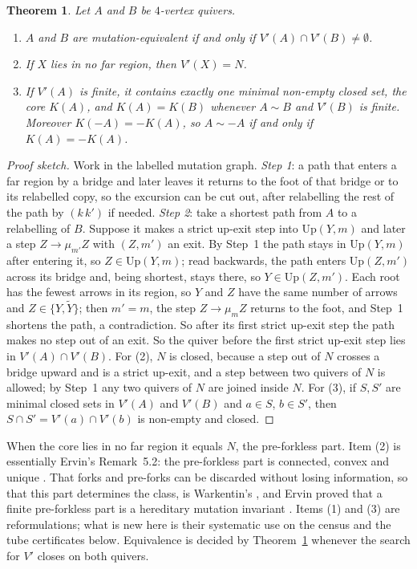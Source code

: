 \documentclass[11pt]{amsart}
\newtheorem{theorem}{Theorem}[section]
\theoremstyle{definition}
\theoremstyle{remark}
\newcommand{\Vp}{V'}
\begin{document}
\begin{theorem}\label{thm:core}
Let $A$ and $B$ be $4$-vertex quivers.
\begin{enumerate}
\item $A$ and $B$ are mutation-equivalent if and only if $\Vp(A)\cap\Vp(B)\ne\emptyset$.
\item If $X$ lies in no far region, then $\Vp(X)=N$.
\item If $\Vp(A)$ is finite, it contains exactly one minimal non-empty closed set, the \emph{core} $K(A)$, and $K(A)=K(B)$ whenever $A\sim B$ and $\Vp(B)$ is finite. Moreover $K(-A)=-K(A)$, so $A\sim-A$ if and only if $K(A)=-K(A)$.
\end{enumerate}
\end{theorem}
\begin{proof}[Proof sketch]
Work in the labelled mutation graph. \emph{Step 1}: a path that enters a far region by a bridge and later leaves it returns to the foot of that bridge or to its relabelled copy, so the excursion can be cut out, after relabelling the rest of the path by $(k\,k')$ if needed. \emph{Step 2}: take a shortest path from $A$ to a relabelling of $B$. Suppose it makes a strict up-exit step into $\mathrm{Up}(Y,m)$ and later a step $Z\to\mu_{m'}Z$ with $(Z,m')$ an exit. By Step~1 the path stays in $\mathrm{Up}(Y,m)$ after entering it, so $Z\in\mathrm{Up}(Y,m)$; read backwards, the path enters $\mathrm{Up}(Z,m')$ across its bridge and, being shortest, stays there, so $Y\in\mathrm{Up}(Z,m')$. Each root has the fewest arrows in its region, so $Y$ and $Z$ have the same number of arrows and $Z\in\{Y,\tilde Y\}$; then $m'=m$, the step $Z\to\mu_mZ$ returns to the foot, and Step~1 shortens the path, a contradiction. So after its first strict up-exit step the path makes no step out of an exit. So the quiver before the first strict up-exit step lies in $\Vp(A)\cap\Vp(B)$. For (2), $N$ is closed, because a step out of $N$ crosses a bridge upward and is a strict up-exit, and a step between two quivers of $N$ is allowed; by Step~1 any two quivers of $N$ are joined inside $N$. For (3), if $S,S'$ are minimal closed sets in $\Vp(A)$ and $\Vp(B)$ and $a\in S$, $b\in S'$, then $S\cap S'=\Vp(a)\cap\Vp(b)$ is non-empty and closed.
\end{proof}

When the core lies in no far region it equals $N$, the pre-forkless part. Item (2) is essentially Ervin's Remark~5.2: the pre-forkless part is connected, convex and unique \cite[Rem.~5.2]{Erv}. That forks and pre-forks can be discarded without losing information, so that this part determines the class, is Warkentin's \cite[Cor.~4.5 and the remark after it]{War}, and Ervin proved that a finite pre-forkless part is a hereditary mutation invariant \cite[Thm.~1.2]{Erv}. Items (1) and (3) are reformulations; what is new here is their systematic use on the census and the tube certificates below. Equivalence is decided by Theorem~\ref{thm:core} whenever the search for $\Vp$ closes on both quivers.
\end{document}
